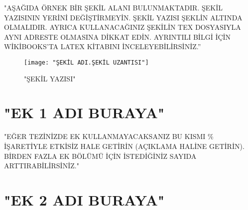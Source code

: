 \documentclass[12pt]{report}
\begin{document}
"AŞAĞIDA ÖRNEK BİR ŞEKİL ALANI BULUNMAKTADIR. ŞEKİL YAZISININ YERİNİ DEĞİŞTİRMEYİN. ŞEKİL YAZISI ŞEKLİN ALTINDA OLMALIDIR. AYRICA KULLANACAĞINIZ ŞEKİLİN TEX DOSYASIYLA AYNI ADRESTE OLMASINA DİKKAT EDİN. AYRINTILI BİLGİ İÇİN WİKİBOOKS'TA LATEX KİTABINI İNCELEYEBİLİRSİNİZ.''

\begin{figure}[!h]
\begin{center}
\texttt{[image: "ŞEKİL ADI.ŞEKİL UZANTISI"]}
\end{center}
\caption{"ŞEKİL YAZISI" \label{fig: "ŞEKİL ETİKETİ"}}
\end{figure}



{}


\begin{appendices}
\chapter{"EK 1 ADI BURAYA"}
\label{appx: "ETİKET BURAYA"}
\onehalfspacing

"EĞER TEZİNİZDE EK KULLANMAYACAKSANIZ BU KISMI \% İŞARETİYLE ETKİSİZ HALE GETİRİN (AÇIKLAMA HALİNE GETİRİN). BİRDEN FAZLA EK BÖLÜMÜ İÇİN İSTEDİĞİNİZ SAYIDA ARTTIRABİLİRSİNİZ."

\chapter{"EK 2 ADI BURAYA"}
\label{sec: "ETİKET BURAYA"}


\end{appendices}
\end{document}
